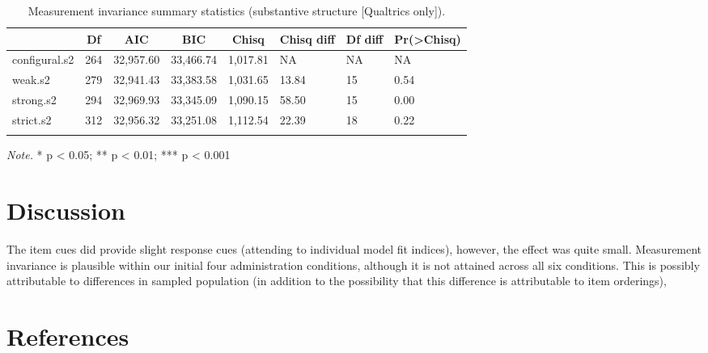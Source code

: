 \documentclass[
  english,
  man]{apa6}
\begin{document}
\begin{table}[tbp]

\begin{center}
\begin{threeparttable}

\caption{\label{tab:measinv.siop3.sub}Measurement invariance summary statistics (substantive structure [Qualtrics only]).}

\begin{tabular}{llllllll}
\toprule
 & \multicolumn{1}{c}{Df} & \multicolumn{1}{c}{AIC} & \multicolumn{1}{c}{BIC} & \multicolumn{1}{c}{Chisq} & \multicolumn{1}{c}{Chisq diff} & \multicolumn{1}{c}{Df diff} & \multicolumn{1}{c}{Pr(>Chisq)}\\
\midrule
configural.s2 & 264 & 32,957.60 & 33,466.74 & 1,017.81 & NA & NA & NA\\
weak.s2 & 279 & 32,941.43 & 33,383.58 & 1,031.65 & 13.84 & 15 & 0.54\\
strong.s2 & 294 & 32,969.93 & 33,345.09 & 1,090.15 & 58.50 & 15 & 0.00\\
strict.s2 & 312 & 32,956.32 & 33,251.08 & 1,112.54 & 22.39 & 18 & 0.22\\
\bottomrule
\addlinespace
\end{tabular}

\begin{tablenotes}[para]
\normalsize{\textit{Note.} * p < 0.05; ** p < 0.01; *** p < 0.001}
\end{tablenotes}

\end{threeparttable}
\end{center}

\end{table}

\hypertarget{discussion}{%
\section{Discussion}\label{discussion}}

The item cues did provide slight response cues (attending to individual model fit indices), however, the effect was quite small. Measurement invariance is plausible within our initial four administration conditions, although it is not attained across all six conditions. This is possibly attributable to differences in sampled population (in addition to the possibility that this difference is attributable to item orderings),

\newpage

\hypertarget{references}{%
\section{References}\label{references}}
\end{document}
